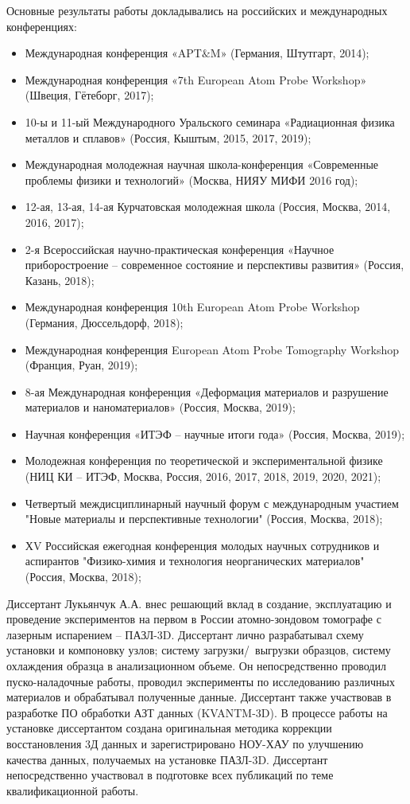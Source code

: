 {\probation}
Основные результаты работы докладывались на российских и международных конференциях:
\begin{itemize}
	\item Международная конференция «APT$\&$M» (Германия, Штутгарт, 2014);
	\item Международная конференция «7th European Atom Probe Workshop» (Швеция, Гётеборг, 2017);
	\item 10-ы и 11-ый Международного Уральского семинара «Радиационная физика металлов и сплавов» (Россия, Кыштым, 2015, 2017, 2019);
	\item Международная молодежная научная школа-конференция «Современные проблемы физики и технологий» (Москва, НИЯУ МИФИ 2016 год);
	\item 12-ая, 13-ая, 14-ая Курчатовская молодежная школа (Россия, Москва, 2014, 2016, 2017);
	\item 2-я Всероссийская научно-практическая конференция «Научное приборостроение – современное состояние и перспективы развития» (Россия, Казань, 2018);
	\item Международная конференция 10th European Atom Probe Workshop (Германия, Дюссельдорф, 2018);
	\item Международная конференция European Atom Probe Tomography Workshop (Франция, Руан, 2019);
	\item 8-ая Международная конференция «Деформация материалов и разрушение материалов и наноматериалов» (Россия, Москва, 2019); 
	\item Научная конференция «ИТЭФ – научные итоги года» (Россия, Москва, 2019);
	\item Молодежная конференция по теоретической и экспериментальной физике (НИЦ КИ – ИТЭФ, Москва, Россия, 2016, 2017, 2018, 2019, 2020, 2021);
	\item Четвертый междисциплинарный научный форум с международным участием "Новые материалы и перспективные технологии" (Россия, Москва, 2018);
	\item ХV Российская ежегодная конференция молодых научных сотрудников и аспирантов "Физико-химия и технология неорганических материалов" (Россия, Москва, 2018);
	
\end{itemize}

{\contribution} Диссертант Лукьянчук А.А. внес решающий вклад в создание, эксплуатацию и проведение экспериментов на первом в России атомно-зондовом томографе с лазерным испарением – ПАЗЛ-3D. Диссертант лично разрабатывал схему установки и компоновку узлов; систему загрузки/~выгрузки образцов, систему охлаждения образца в анализационном объеме. Он непосредственно проводил пуско-наладочные работы, проводил эксперименты по исследованию различных материалов и обрабатывал полученные данные. Диссертант также участвовав в разработке ПО обработки АЗТ данных (KVANTM-3D). В процессе работы на установке диссертантом создана оригинальная методика коррекции восстановления 3Д данных и зарегистрировано НОУ-ХАУ по улучшению качества данных, получаемых на установке ПАЗЛ-3D. Диссертант непосредственно участвовал в подготовке всех публикаций по теме квалификационной работы.






